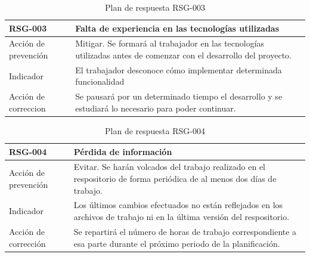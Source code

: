 \begin{table}[htpb]
\centering
\begin{tabularx}{\textwidth}{|l|X|}
\hline
RSG-003              & Falta de experiencia en las tecnologías utilizadas                                                                \\ \hline
Acción de prevención & Mitigar. Se formará al trabajador en las tecnologías utilizadas antes de comenzar con el desarrollo del proyecto. \\ \hline
Indicador            & El trabajador desconoce cómo implementar determinada funcionalidad                                                \\ \hline
Acción de correccion & Se pausará por un determinado tiempo el desarrollo y se estudiará lo necesario para poder continuar.              \\ \hline
\end{tabularx}
\caption{Plan de respuesta RSG-003}
\end{table}


\begin{table}[htpb]
\centering
\begin{tabularx}{\textwidth}{|l|X|}
\hline
RSG-004              & Pérdida de información                                                                                                  \\ \hline
Acción de prevención & Evitar. Se harán volcados del trabajo realizado en el respositorio de forma periódica de al menos dos días de trabajo.  \\ \hline
Indicador            & Los últimos cambios efectuados no están reflejados en los archivos de trabajo ni en la última versión del respositorio. \\ \hline
Acción de corrección & Se repartirá el número de horas de trabajo correspondiente a esa parte durante el próximo periodo de la planificación.  \\ \hline
\end{tabularx}
\caption{Plan de respuesta RSG-004}
\end{table}


